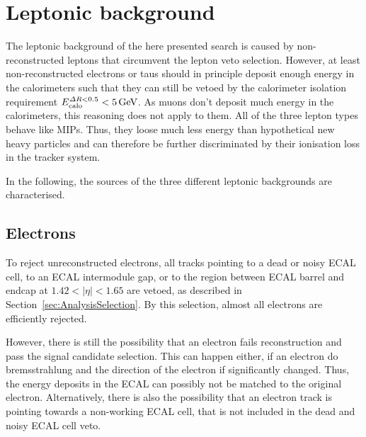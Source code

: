 \section{Leptonic background}
\label{sec:LeptonicBkg}

The leptonic background of the here presented search is caused by non-reconstructed leptons that circumvent the lepton veto selection.
However, at least non-reconstructed electrons or taus should in principle deposit enough energy in the calorimeters such that they can still be vetoed by the calorimeter isolation requirement $E^{\Delta R<0.5}_{\text{calo}}<5\,\text{Ge}\kern-0.06667em\text{V}$.
As muons don't deposit much energy in the calorimeters, this reasoning does not apply to them.
All of the three lepton types behave like MIPs.
Thus, they loose much less energy than hypothetical new heavy particles and can therefore be further discriminated by their ionisation loss in the tracker system.

In the following, the sources of the three different leptonic backgrounds are characterised.

\subsection*{Electrons}
To reject unreconstructed electrons, all tracks pointing to a dead or noisy ECAL cell, to an ECAL intermodule gap, or to the region between ECAL barrel and endcap at $1.42<|\eta|<1.65$ are vetoed, as described in Section~\ref{sec:AnalysisSelection}.
By this selection, almost all electrons are efficiently rejected.

However, there is still the possibility that an electron fails reconstruction and pass the signal candidate selection.
This can happen either, if an electron do bremsstrahlung and the direction of the electron if significantly changed.
Thus, the energy deposits in the ECAL can possibly not be matched to the original electron.
Alternatively, there is also the possibility that an electron track is pointing towards a non-working ECAL cell, that is not included in the dead and noisy ECAL cell veto.

